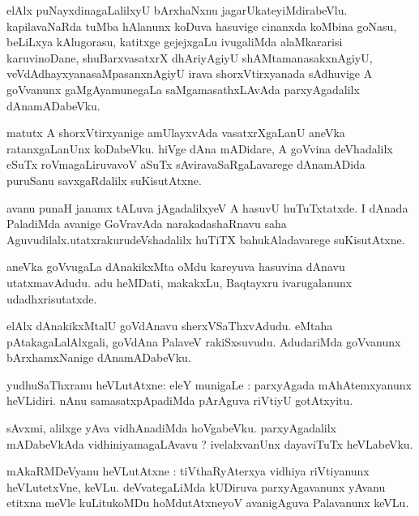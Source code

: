\documentclass{article}
\begin{document}
\begin{mn}
elAlx puNayxdinagaLalilxyU bArxhaNxnu jagarUkateyiMdirabeVlu. kapilavaNaRda tuMba hAlanunx koDuva 
hasuvige cinanxda koMbina goNasu, beLiLxya kAlugorasu, katitxge gejejxgaLu ivugaliMda 
alaMkararisi karuvinoDane, shuBarxvasatxrX dhAriyAgiyU shAMtamanasakxnAgiyU, 
veVdAdhayxyanasaMpasanxnAgiyU irava shorxVtirxyanada sAdhuvige A goVvanunx gaMgAyamunegaLa 
saMgamasathxLAvAda parxyAgadalilx dAnamADabeVku.
\end{mn}

\begin{mn}
matutx A shorxVtirxyanige amUlayxvAda vasatxrXgaLanU aneVka ratanxgaLanUnx koDabeVku. hiVge dAna 
mADidare, A goVvina deVhadalilx eSuTx roVmagaLiruvavoV aSuTx sAviravaSaRgaLavarege dAnamADida 
puruSanu savxgaRdalilx suKisutAtxne.
\end{mn}

\begin{mn}
avanu punaH janamx  tALuva jAgadalilxyeV A hasuvU huTuTxtatxde. I dAnada PaladiMda avanige 
GoVravAda narakadashaRnavu saha Aguvudilalx.utatxrakurudeVshadalilx huTiTX bahukAladavarege 
suKisutAtxne.
\end{mn}

\begin{mn}
aneVka goVvugaLa dAnakikxMta oMdu kareyuva hasuvina dAnavu utatxmavAdudu. adu heMDati, makakxLu, 
Baqtayxru ivarugalanunx udadhxrisutatxde.
\end{mn}

\begin{mn}
elAlx dAnakikxMtalU goVdAnavu sherxVSaThxvAdudu. eMtaha pAtakagaLalAlxgali, goVdAna PalaveV 
rakiSxsuvudu. AdudariMda goVvanunx bArxhamxNanige dAnamADabeVku.
\end{mn}


\begin{mn}
yudhuSaThxranu heVLutAtxne: eleY munigaLe : parxyAgada mAhAtemxyanunx heVLidiri. nAnu 
samasatxpApadiMda pArAguva riVtiyU gotAtxyitu.
\end{mn}

\begin{mn}
sAvxmi, alilxge yAva vidhAnadiMda hoVgabeVku. parxyAgadalilx mADabeVkAda vidhiniyamagaLAvavu ? 
ivelalxvanUnx dayaviTuTx heVLabeVku.
\end{mn}

\begin{mn}
mAkaRMDeVyanu heVLutAtxne : tiVthaRyAterxya vidhiya riVtiyanunx heVLutetxVne, keVLu. 
deVvategaLiMda kUDiruva parxyAgavanunx yAvanu etitxna meVle kuLitukoMDu hoMdutAtxneyoV avanigAguva
Palavanunx keVLu.
\end{mn}
\end{document}
